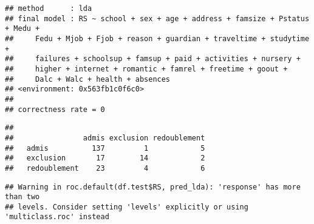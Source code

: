 \documentclass[
]{article}
\newenvironment{Shaded}{\begin{snugshade}}{\end{snugshade}}
\newcommand{\AttributeTok}[1]{\textcolor[rgb]{0.77,0.63,0.00}{#1}}
\newcommand{\CommentTok}[1]{\textcolor[rgb]{0.56,0.35,0.01}{\textit{#1}}}
\newcommand{\DecValTok}[1]{\textcolor[rgb]{0.00,0.00,0.81}{#1}}
\newcommand{\FunctionTok}[1]{\textcolor[rgb]{0.00,0.00,0.00}{#1}}
\newcommand{\NormalTok}[1]{#1}
\newcommand{\OtherTok}[1]{\textcolor[rgb]{0.56,0.35,0.01}{#1}}
\newcommand{\SpecialCharTok}[1]{\textcolor[rgb]{0.00,0.00,0.00}{#1}}
\begin{document}
\begin{verbatim}
## method      : lda 
## final model : RS ~ school + sex + age + address + famsize + Pstatus + Medu + 
##     Fedu + Mjob + Fjob + reason + guardian + traveltime + studytime + 
##     failures + schoolsup + famsup + paid + activities + nursery + 
##     higher + internet + romantic + famrel + freetime + goout + 
##     Dalc + Walc + health + absences
## <environment: 0x563fb1c0f6c0>
## 
## correctness rate = 0
\end{verbatim}

\begin{Shaded}
\end{Shaded}

\begin{verbatim}
##               
##                admis exclusion redoublement
##   admis          137         1            5
##   exclusion       17        14            2
##   redoublement    23         4            6
\end{verbatim}

\begin{Shaded}
\end{Shaded}

\begin{verbatim}
## Warning in roc.default(df.test$RS, pred_lda): 'response' has more than two
## levels. Consider setting 'levels' explicitly or using 'multiclass.roc' instead
\end{verbatim}
\end{document}
